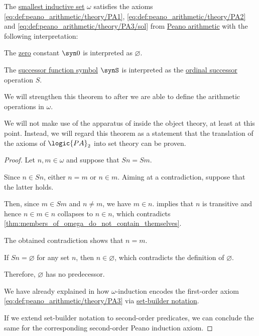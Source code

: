 \begin{proposition}\label{thm:omega_is_model_of_pa_without_operations}
  The \hyperref[def:smallest_inductive_set]{smallest inductive set} \( \omega \) satisfies the axioms \eqref{eq:def:peano_arithmetic/theory/PA1}, \eqref{eq:def:peano_arithmetic/theory/PA2} and \eqref{eq:def:peano_arithmetic/theory/PA3/sol} from \hyperref[def:peano_arithmetic]{Peano arithmetic} with the following interpretation:
  \begin{thmenum}
     The \hyperref[def:peano_arithmetic/signature/zero]{zero} constant \( \syn0 \) is interpreted as \( \varnothing \).

     The \hyperref[def:peano_arithmetic/signature/succ]{successor function symbol} \( \synS \) is interpreted as the \hyperref[def:ordinal_successor]{ordinal successor} operation \( S \).
  \end{thmenum}
\end{proposition}
\begin{comments}
  \item We will strengthen this theorem to  after we are able to define the arithmetic operations in \( \omega \).

  \item We will not make use of the apparatus of  inside the object theory, at least at this point. Instead, we will regard this theorem as a statement that the translation of the axioms of \( \logic{PA}_2 \) into set theory can be proven.
\end{comments}
\begin{proof}
   Let \( n, m \in \omega \) and suppose that \( Sn = Sm \).

  Since \( n \in Sn \), either \( n = m \) or \( n \in m \). Aiming at a contradiction, suppose that the latter holds.

  Then, since \( m \in Sm \) and \( n \neq m \), we have \( m \in n \).  implies that \( n \) is transitive and hence \( n \in m \in n \) collapses to \( n \in n \), which contradicts \cref{thm:members_of_omega_do_not_contain_themselves}.

  The obtained contradiction shows that \( n = m \).

   If \( Sn = \varnothing \) for any set \( n \), then \( n \in \varnothing \), which contradicts the definition of \( \varnothing \).

  Therefore, \( \varnothing \) has no predecessor.

   We have already explained in  how \( \omega \)-induction encodes the first-order axiom \eqref{eq:def:peano_arithmetic/theory/PA3} via \hyperref[def:set_theory_definition]{set-builder notation}.

  If we extend set-builder notation to second-order predicates, we can conclude the same for the corresponding second-order Peano induction axiom.
\end{proof}

